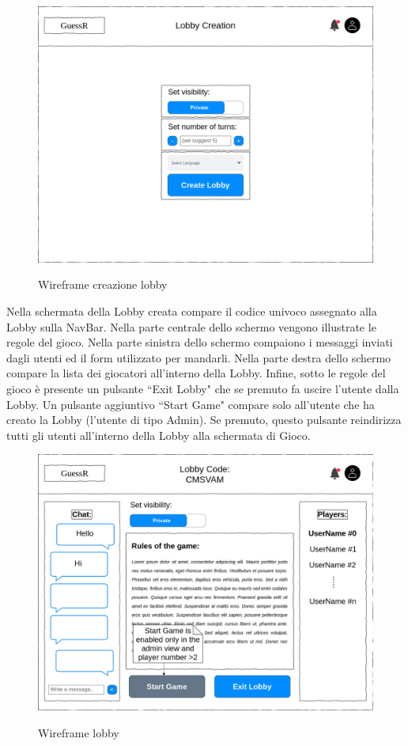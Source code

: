 \begin{figure}[H]
    \caption{Wireframe creazione lobby}
    \centering
    \includegraphics[width=400mm]{img/wireframes/lobby_creation.png}
    \label{fig:wireframe_lobby_creation}
\end{figure}

\noindent Nella schermata della Lobby creata compare il codice univoco assegnato alla Lobby sulla NavBar. Nella parte centrale dello schermo vengono illustrate le regole del gioco. Nella parte sinistra dello schermo compaiono i messaggi inviati dagli utenti ed il form utilizzato per mandarli. Nella parte destra dello schermo compare la lista dei giocatori all'interno della Lobby.
Infine, sotto le regole del gioco è presente un pulsante ``Exit Lobby" che se premuto fa uscire l'utente dalla Lobby. Un pulsante aggiuntivo ``Start Game" compare solo all'utente che ha creato la Lobby (l'utente di tipo Admin). Se premuto, questo pulsante reindirizza tutti gli utenti all'interno della Lobby alla schermata di Gioco.

\begin{figure}[H]
    \caption{Wireframe lobby}
    \centering
    \includegraphics[width=400mm]{img/wireframes/in_lobby.png}
    \label{fig:wireframe_in_lobby}
\end{figure}

